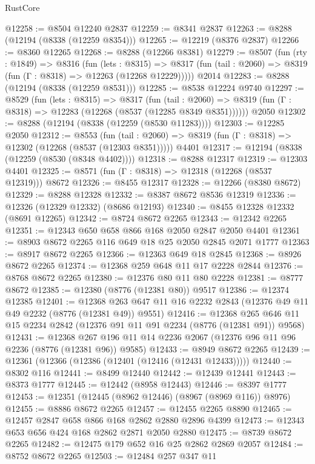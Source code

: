 \begin{lexlean}{RustCore}
\begin{coremodule}
@12258 := @8504 @12240 @2837
@12259 := @8341 @2837
@12263 := @8288 (@12194 (@8338 (@12259 @8354)))
@12265 := @12219 (@8376 @2837)
@12266 := @8360 @12265
@12268 := @8288 (@12266 @8381)
@12279 := @8507
    (fun (rty : @1849) =>
    @8316
      (fun (lets : @8315) =>
      @8317 (fun (tail : @2060) => @8319 (fun (Γ : @8318) => @12263 (@12268 @12229)))))
    @2014
@12283 := @8288 (@12194 (@8338 (@12259 @8531)))
@12285 := @8538 @12224 @9740
@12297 := @8529
    (fun (lets : @8315) =>
    @8317
      (fun (tail : @2060) =>
      @8319 (fun (Γ : @8318) => @12283 (@12268 (@8537 (@12285 @8349 @8351))))))
    @2050
@12302 := @8288 (@12194 (@8338 (@12259 (@8530 @11283))))
@12303 := @12285 @2050
@12312 := @8553
    (fun (tail : @2060) => @8319 (fun (Γ : @8318) => @12302 (@12268 (@8537 (@12303 @8351)))))
    @4401
@12317 := @12194 (@8338 (@12259 (@8530 (@8348 @4402))))
@12318 := @8288 @12317
@12319 := @12303 @4401
@12325 := @8571 (fun (Γ : @8318) => @12318 (@12268 (@8537 @12319))) @8672
@12326 := @8455 @12317
@12328 := @12266 (@8380 @8672)
@12329 := @8288 @12328
@12332 := @8387 @8672 @8536 @12319
@12336 := @12326 (@12329 @12332) (@8686 @12193)
@12340 := @8455 @12328 @12332 (@8691 @12265)
@12342 := @8724 @8672 @2265
@12343 := @12342 @2265
@12351 := @12343 @650 @658 @866 @168 @2050 @2847 @2050 @4401
@12361 := @8903 @8672 @2265 @116 @649 @18 @25 @2050 @2845 @2071 @1777
@12363 := @8917 @8672 @2265
@12366 := @12363 @649 @18 @2845
@12368 := @8926 @8672 @2265
@12374 := @12368 @259 @648 @11 @17 @2228 @2844
@12376 := @8768 @8672 @2265
@12380 := @12376 @80 @11 @80 @2228
@12381 := @8777 @8672
@12385 := @12380 (@8776 (@12381 @80)) @9517
@12386 := @12374 @12385
@12401 := @12368 @263 @647 @11 @16 @2232 @2843 (@12376 @49 @11 @49 @2232 (@8776 (@12381 @49)) @9551)
@12416 := @12368 @265 @646 @11 @15 @2234 @2842 (@12376 @91 @11 @91 @2234 (@8776 (@12381 @91)) @9568)
@12431 := @12368 @267 @196 @11 @14 @2236 @2067 (@12376 @96 @11 @96 @2236 (@8776 (@12381 @96)) @9585)
@12433 := @8949 @8672 @2265
@12439 := @12361 (@12366 (@12386 (@12401 (@12416 (@12431 @12433)))))
@12440 := @8302 @116
@12441 := @8499 @12440
@12442 := @12439 @12441
@12443 := @8373 @1777
@12445 := @12442 (@8958 @12443)
@12446 := @8397 @1777
@12453 := @12351 (@12445 (@8962 @12446) (@8967 (@8969 @116)) @8976)
@12455 := @8886 @8672 @2265
@12457 := @12455 @2265 @8890
@12465 := @12457 @2847 @658 @866 @168 @2862 @2880 @2896 @4399
@12473 := @12343 @653 @656 @424 @168 @2862 @2871 @2050 @2880
@12475 := @8739 @8672 @2265
@12482 := @12475 @179 @652 @16 @25 @2862 @2869 @2057
@12484 := @8752 @8672 @2265
@12503 := @12484
    @257
    @347
    @11

\end{coremodule}
\end{lexlean}
